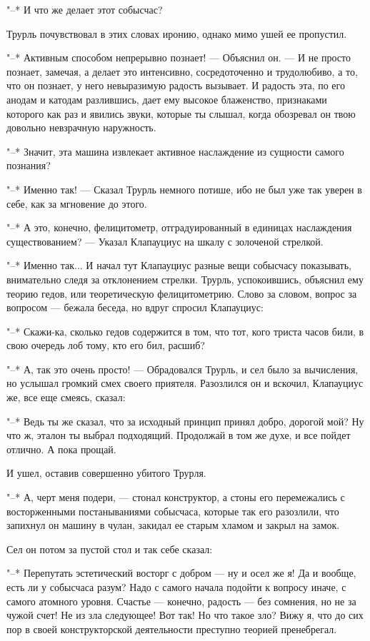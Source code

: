 "--* И что же делает этот собысчас?

Трурль почувствовал в этих словах иронию, однако мимо
ушей ее пропустил.

"--* Активным способом непрерывно познает! --- Объяснил он. --- И
не просто познает, замечая, а делает это интенсивно,
сосредоточенно и трудолюбиво, а то, что он познает, у него
невыразимую радость вызывает. И радость эта, по его анодам и
катодам разлившись, дает ему высокое блаженство, признаками
которого как раз и явились звуки, которые ты слышал, когда
обозревал он твою довольно невзрачную наружность.

"--* Значит, эта машина извлекает активное наслаждение из
сущности самого познания?

"--* Именно так! --- Сказал Трурль немного потише, ибо не
был уже так уверен в себе, как за мгновение до этого.

"--* А это, конечно, фелицитометр, отградуированный в
единицах наслаждения существованием? --- Указал Клапауциус
на шкалу с золоченой стрелкой.

"--* Именно так... И начал тут Клапауциус разные вещи
собысчасу показывать, внимательно следя за отклонением
стрелки. Трурль, успокоившись, объяснил ему теорию гедов,
или теоретическую фелицитометрию. Слово за словом, вопрос за
вопросом --- бежала беседа, но вдруг спросил Клапауциус:

"--* Скажи-ка, сколько гедов содержится в том, что тот,
кого триста часов били, в свою очередь лоб тому, кто его
бил, расшиб?

"--* А, так это очень просто! --- Обрадовался Трурль, и сел
было за вычисления, но услышал громкий смех своего приятеля.
Разозлился он и вскочил, Клапауциус же, все еще смеясь,
сказал:

"--* Ведь ты же сказал, что за исходный принцип принял
добро, дорогой мой? Ну что ж, эталон ты выбрал подходящий.
Продолжай в том же духе, и все пойдет отлично. А пока
прощай.

И ушел, оставив совершенно убитого Трурля.

"--* А, черт меня подери, --- стонал конструктор, а стоны
его перемежались с восторженными постанываниями собысчаса,
которые так его разозлили, что запихнул он машину в чулан,
закидал ее старым хламом и закрыл на замок.

Сел он потом за пустой стол и так себе сказал:

"--* Перепутать эстетический восторг с добром --- ну и осел
же я! Да и вообще, есть ли у собысчаса разум? Надо с самого
начала подойти к вопросу иначе, с самого атомного уровня.
Счастье --- конечно, радость --- без сомнения, но не за чужой
счет! Не из зла следующее! Вот так! Но что такое зло? Вижу
я, что до сих пор в своей конструкторской деятельности
преступно теорией пренебрегал.

